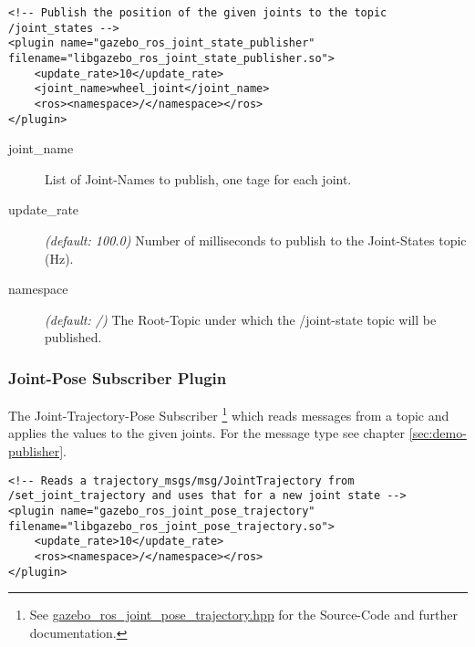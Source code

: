 \lstset{language=XML}
\begin{lstlisting}[label=code:xml-urdf-joint-state, caption={[URDF-Section for Joint-States]Loading the \Gls{gazebo}-Plugin and publish \textit{wheel\_joint} to the \textit{/joint\_states} topic.}]
<!-- Publish the position of the given joints to the topic /joint_states -->
<plugin name="gazebo_ros_joint_state_publisher" filename="libgazebo_ros_joint_state_publisher.so">
    <update_rate>10</update_rate>
    <joint_name>wheel_joint</joint_name>
    <ros><namespace>/</namespace></ros>
</plugin>
\end{lstlisting}

\begin{description}
    \item[joint\_name] List of Joint-Names to publish, one tage for each joint.
    \item[update\_rate] \textit{(default: 100.0)} Number of milliseconds to publish to the Joint-States topic (Hz).
    \item[namespace] \textit{(default: /)} The Root-Topic under which the /joint-state topic will be published.
\end{description}


\subsubsection[Joint-Pose]{Joint-Pose Subscriber Plugin} \label{sec:demo-urdf-model-joint-pose}

The Joint-Trajectory-Pose Subscriber \footnote{See \href{https://github.com/ros-simulation/gazebo_ros_pkgs/blob/ros2/gazebo_plugins/include/gazebo_plugins/gazebo_ros_joint_pose_trajectory.hpp}{gazebo\_ros\_joint\_pose\_trajectory.hpp} for the Source-Code and further documentation.} which reads messages from a topic and applies the values to the given joints.
For the message type see chapter \ref{sec:demo-publisher}.

\lstset{language=XML}
\begin{lstlisting}[label=code:xml-urdf-joint-pose, caption={[URDF-Section for Joint-Trajectory Poses]Loading the \Gls{gazebo}-Plugin and subscribe to the \textit{set\_joint\_trajectory} topic to receive new positions for the given joints in the message.}]
<!-- Reads a trajectory_msgs/msg/JointTrajectory from /set_joint_trajectory and uses that for a new joint state -->
<plugin name="gazebo_ros_joint_pose_trajectory" filename="libgazebo_ros_joint_pose_trajectory.so">
    <update_rate>10</update_rate>
    <ros><namespace>/</namespace></ros>
</plugin>
\end{lstlisting}

